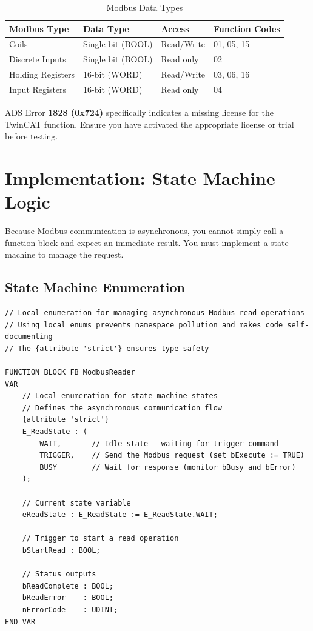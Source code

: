 \documentclass[11pt,a4paper]{article}
\begin{document}
\begin{table}[h]
\centering
\begin{tabular}{@{}llll@{}}
\toprule
\textbf{Modbus Type} & \textbf{Data Type} & \textbf{Access} & \textbf{Function Codes} \\
\midrule
Coils & Single bit (BOOL) & Read/Write & 01, 05, 15 \\
Discrete Inputs & Single bit (BOOL) & Read only & 02 \\
Holding Registers & 16-bit (WORD) & Read/Write & 03, 06, 16 \\
Input Registers & 16-bit (WORD) & Read only & 04 \\
\bottomrule
\end{tabular}
\caption{Modbus Data Types}
\end{table}

\begin{warningbox}
ADS Error \textbf{1828 (0x724)} specifically indicates a missing license for the TwinCAT function. Ensure you have activated the appropriate license or trial before testing.
\end{warningbox}

\section{Implementation: State Machine Logic}

Because Modbus communication is asynchronous, you cannot simply call a function block and expect an immediate result. You must implement a state machine to manage the request.

\subsection{State Machine Enumeration}

\begin{lstlisting}
// Local enumeration for managing asynchronous Modbus read operations
// Using local enums prevents namespace pollution and makes code self-documenting
// The {attribute 'strict'} ensures type safety

FUNCTION_BLOCK FB_ModbusReader
VAR
    // Local enumeration for state machine states
    // Defines the asynchronous communication flow
    {attribute 'strict'}
    E_ReadState : (
        WAIT,       // Idle state - waiting for trigger command
        TRIGGER,    // Send the Modbus request (set bExecute := TRUE)
        BUSY        // Wait for response (monitor bBusy and bError)
    );
    
    // Current state variable
    eReadState : E_ReadState := E_ReadState.WAIT;
    
    // Trigger to start a read operation
    bStartRead : BOOL;
    
    // Status outputs
    bReadComplete : BOOL;
    bReadError    : BOOL;
    nErrorCode    : UDINT;
END_VAR
\end{lstlisting}
\end{document}
